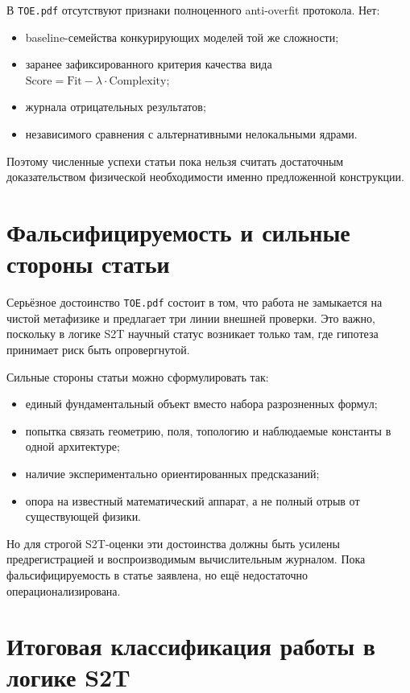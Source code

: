 \documentclass[12pt,a4paper]{article}
\begin{document}
В \texttt{TOE.pdf} отсутствуют признаки полноценного anti-overfit протокола. Нет:
\begin{itemize}
    \item baseline-семейства конкурирующих моделей той же сложности;
    \item заранее зафиксированного критерия качества вида $\mathrm{Score} = \mathrm{Fit} - \lambda \cdot \mathrm{Complexity}$;
    \item журнала отрицательных результатов;
    \item независимого сравнения с альтернативными нелокальными ядрами.
\end{itemize}

Поэтому численные успехи статьи пока нельзя считать достаточным доказательством физической необходимости именно предложенной конструкции.

\section{Фальсифицируемость и сильные стороны статьи}

Серьёзное достоинство \texttt{TOE.pdf} состоит в том, что работа не замыкается на чистой метафизике и предлагает три линии внешней проверки. Это важно, поскольку в логике S2T научный статус возникает только там, где гипотеза принимает риск быть опровергнутой.

Сильные стороны статьи можно сформулировать так:
\begin{itemize}
    \item единый фундаментальный объект вместо набора разрозненных формул;
    \item попытка связать геометрию, поля, топологию и наблюдаемые константы в одной архитектуре;
    \item наличие экспериментально ориентированных предсказаний;
    \item опора на известный математический аппарат, а не полный отрыв от существующей физики.
\end{itemize}

Но для строгой S2T-оценки эти достоинства должны быть усилены предрегистрацией и воспроизводимым вычислительным журналом. Пока фальсифицируемость в статье заявлена, но ещё недостаточно операционализирована.

\section{Итоговая классификация работы в логике S2T}
\end{document}
